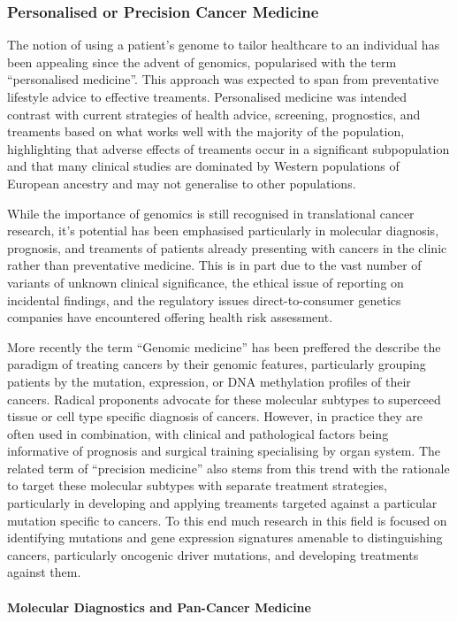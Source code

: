 \subsubsection{Personalised or Precision Cancer Medicine}
The notion of using a patient's genome to tailor healthcare to an individual has been appealing since the advent of genomics, popularised with the term ``personalised medicine''. This approach was expected to span from preventative lifestyle advice to effective treaments. Personalised medicine was intended contrast with current strategies of health advice, screening, prognostics, and treaments based on what works well with the majority of the population, highlighting that adverse effects of treaments occur in a significant subpopulation and that many clinical studies are dominated by Western populations of European ancestry and may not generalise to other populations.

While the importance of genomics is still recognised in translational cancer research, it's potential has been emphasised particularly in molecular diagnosis, prognosis, and treaments of patients already presenting with cancers in the clinic rather than preventative medicine. This is in part due to the vast number of variants of unknown clinical significance, the ethical issue of reporting on incidental findings, and the regulatory issues direct-to-consumer genetics companies have encountered offering health risk assessment.

More recently the term ``Genomic medicine'' has been preffered the describe the paradigm of treating cancers by their genomic features, particularly grouping patients by the mutation, expression, or DNA methylation profiles of their cancers. Radical proponents advocate for these molecular subtypes to superceed tissue or cell type specific diagnosis of cancers. However, in practice they are often used in combination, with clinical and pathological factors being informative of prognosis and surgical training specialising by organ system. The related term of ``precision medicine'' also stems from this trend with the rationale to target these molecular subtypes with separate treatment strategies, particularly in developing and applying treaments targeted against a particular mutation specific to cancers. To this end much research in this field is focused on identifying mutations and gene expression signatures amenable to distinguishing cancers, particularly oncogenic driver mutations, and developing treatments against them.


\paragraph{Molecular Diagnostics and Pan-Cancer Medicine}
